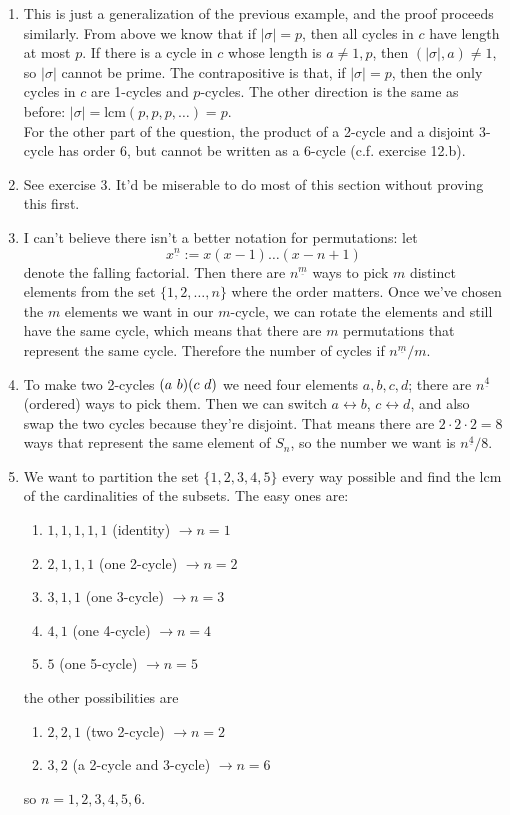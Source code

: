 \documentclass[]{article}
\newcommand{\abs}[1]{\left\vert #1 \right\vert}
\newcommand*{\cycle}[1]{( \foreach \entry [count=\i] in {#1} {\ifnum\i>1\ \fi\entry})}
\begin{document}
\begin{enumerate}
\item This is just a generalization of the previous example, and the proof proceeds similarly. From above we know that if $\abs{\sigma} = p$, then all cycles in $c$ have length at most $p$. If there is a cycle in $c$ whose length is $a \neq 1,p$, then $(\abs{\sigma}, a) \neq 1$, so $\abs{\sigma}$ cannot be prime. The contrapositive is that, if $\abs{\sigma} = p$, then the only cycles in $c$ are 1-cycles and $p$-cycles. The other direction is the same as before: $\abs{\sigma} = \text{lcm}(p,p,p,\ldots) = p$. \\
For the other part of the question, the product of a 2-cycle and a disjoint 3-cycle has order 6, but cannot be written as a 6-cycle (c.f. exercise 12.b).


\item See exercise 3. It'd be miserable to do most of this section without proving this first.


\item I can't believe there isn't a better notation for permutations: let
\begin{equation}
x^{\underline{n}} := x(x-1)\ldots(x-n+1)
\end{equation}
denote the falling factorial. Then there are $n^{\underline{m}}$ ways to pick $m$ distinct elements from the set $\{1,2,\ldots, n\}$ where the order matters. Once we've chosen the $m$ elements we want in our $m$-cycle, we can rotate the elements and still have the same cycle, which means that there are $m$ permutations that represent the same cycle. Therefore the number of cycles if $n^{\underline{m}}/m$.


\item To make two 2-cycles $\cycle{a,b}\cycle{c,d}$ we need four elements $a,b,c,d$; there are $n^{\underline{4}}$ (ordered) ways to pick them. Then we can switch $a \leftrightarrow b$, $c \leftrightarrow d$, and also swap the two cycles because they're disjoint. That means there are $2\cdot 2 \cdot 2 = 8$ ways that represent the same element of $S_n$, so the number we want is $n^{\underline{4}}/8$.


\item We want to partition the set $\{1, 2, 3, 4, 5\}$ every way possible and find the lcm of the cardinalities of the subsets. The easy ones are:
\begin{enumerate}
\item $1,1,1,1,1$ (identity) $\rightarrow n = 1$
\item $2,1,1,1$ (one 2-cycle) $\rightarrow n = 2$
\item $3,1,1$ (one 3-cycle) $\rightarrow n = 3$
\item $4,1$ (one 4-cycle) $\rightarrow n = 4$
\item $5$ (one 5-cycle) $\rightarrow n = 5$
\end{enumerate}
the other possibilities are
\begin{enumerate}
\item $2,2,1$ (two 2-cycle) $\rightarrow n = 2$
\item $3,2$ (a 2-cycle and 3-cycle) $\rightarrow n = 6$
\end{enumerate}
so $n = 1,2,3,4,5,6$.



\end{enumerate}
\end{document}
